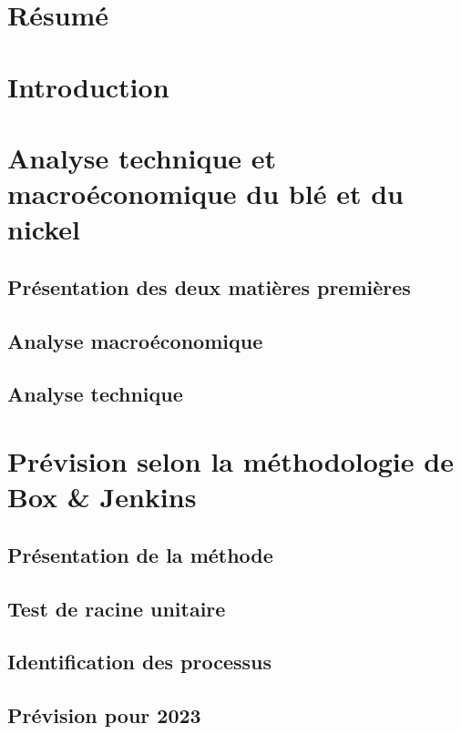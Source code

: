 \documentclass[12pt,a4paper]{article}
\begin{document}
\clearpage
{}
\pagestyle{fancy}
\fancyhead{}\fancyfoot[C]{\thepage}
\section*{Résumé}
\setcounter{tocdepth}{6}
\renewcommand\contentsname{Sommaire}
\tableofcontents



\section*{Introduction}
\section{Analyse technique et macroéconomique du blé et du nickel}
\subsection{Présentation des deux matières premières}
\subsection{Analyse macroéconomique}
\subsection{Analyse technique}




\section{Prévision selon la méthodologie de Box \& Jenkins}
\subsection{Présentation de la méthode}
\subsection{Test de racine unitaire}
\subsection{Identification des processus}
\subsection{Prévision pour 2023}
\end{document}
